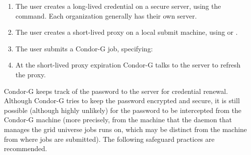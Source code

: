\begin{enumerate}
\item{The user creates a long-lived credential}
on a secure  server, using the
 command.
Each organization generally has their own  server.

\item{The user creates a short-lived proxy}
on a local submit machine,
using
 or .

\item{The user submits}
a Condor-G job,
specifying:

\item{At the short-lived proxy expiration}
Condor-G talks to
the  server to refresh the proxy.

\end{enumerate}


Condor-G keeps track of the password to the  server
for credential renewal.
Although Condor-G tries to keep the password encrypted and secure,
it is still possible (although highly unlikely) for the password
to be intercepted from the Condor-G machine
(more precisely, from the machine that the
 daemon that manages the grid universe jobs runs on,
which may be distinct from the machine from where jobs are submitted).
The following safeguard practices are recommended.

